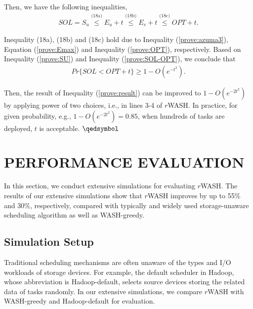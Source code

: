 \documentclass[conference]{IEEEtran}
\begin{document}
\vspace{-0.2cm}
Then, we have the following inequalities,
\vspace{-0.2cm}
\begin{align}
SOL = S_u  
\overset{\text{(18a)}}{\leq} E_u+t
\overset{\text{(18b)}}{\leq} E_v+t
\overset{\text{(18c)}}{\leq} OPT+t.\label{prove:SOL-OPT}
\end{align}

Inequality (18a), (18b) and (18c) hold due to Inequality (\ref{prove:azuma3}), Equation (\ref{prove:Emax}) and Inequality (\ref{prove:OPT}), respectively.  Based on Inequality (\ref{prove:SU}) and Inequality (\ref{prove:SOL-OPT}), we conclude that
\vspace{-0.1cm}
\begin{align}
Pr\{SOL<OPT+t\}\geq 1 - O(e^{-t^2}).\label{prove:result}
\end{align}

\vspace{-0.2cm}

Then, the result of Inequality (\ref{prove:result}) can be improved to $1 - O(e^{-2t^2})$ by applying power of two choices, i.e., in lines 3-4 of $r$WASH. In practice, for given probability, e.g., $1 - O(e^{-2t^2}) = 0.85$, when hundreds of tasks are deployed, $t$ is acceptable. \hfill \;$\qedsymbol$

\section{PERFORMANCE EVALUATION}\label{PERFORMANCE_EVALUATION}
In this section, we conduct extensive simulations for evaluating $r$WASH. The results of our extensive simulations show that $r$WASH improves by up to 55\% and 30\%, respectively, compared with typically and widely used storage-unaware scheduling algorithm as well as WASH-greedy.

\subsection{Simulation Setup}\label{SCM}
Traditional scheduling mechanisms are often unaware of the types and I/O workloads of storage devices. For example, the default scheduler in Hadoop, whose abbreviation is Hadoop-default, selects source devices storing the related data of tasks randomly. In our extensive simulations, we compare $r$WASH with WASH-greedy and Hadoop-default for evaluation.
\end{document}
